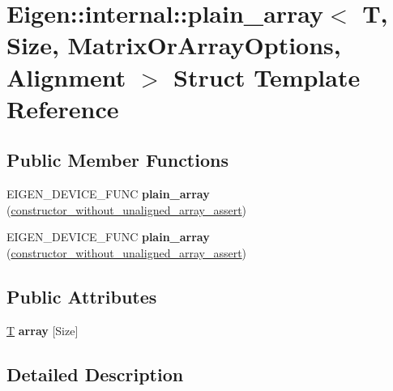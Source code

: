 \hypertarget{struct_eigen_1_1internal_1_1plain__array}{}\section{Eigen\+:\+:internal\+:\+:plain\+\_\+array$<$ T, Size, Matrix\+Or\+Array\+Options, Alignment $>$ Struct Template Reference}
\label{struct_eigen_1_1internal_1_1plain__array}
\subsection*{Public Member Functions}
\begin{DoxyCompactItemize}
\item 
\mbox{\label{struct_eigen_1_1internal_1_1plain__array_a1c0042faeb6279d0bab4b890797e7e54}} 
E\+I\+G\+E\+N\+\_\+\+D\+E\+V\+I\+C\+E\+\_\+\+F\+U\+NC {\bfseries plain\+\_\+array} (\hyperlink{struct_eigen_1_1internal_1_1constructor__without__unaligned__array__assert}{constructor\+\_\+without\+\_\+unaligned\+\_\+array\+\_\+assert})
\item 
\mbox{\label{struct_eigen_1_1internal_1_1plain__array_a1c0042faeb6279d0bab4b890797e7e54}} 
E\+I\+G\+E\+N\+\_\+\+D\+E\+V\+I\+C\+E\+\_\+\+F\+U\+NC {\bfseries plain\+\_\+array} (\hyperlink{struct_eigen_1_1internal_1_1constructor__without__unaligned__array__assert}{constructor\+\_\+without\+\_\+unaligned\+\_\+array\+\_\+assert})
\end{DoxyCompactItemize}
\subsection*{Public Attributes}
\begin{DoxyCompactItemize}
\item 
\mbox{\label{struct_eigen_1_1internal_1_1plain__array_ac33b4e992e1a11606e61fe832eb7387b}} 
\hyperlink{group___sparse_core___module}{T} {\bfseries array} \mbox{[}Size\mbox{]}
\end{DoxyCompactItemize}


\subsection{Detailed Description}
